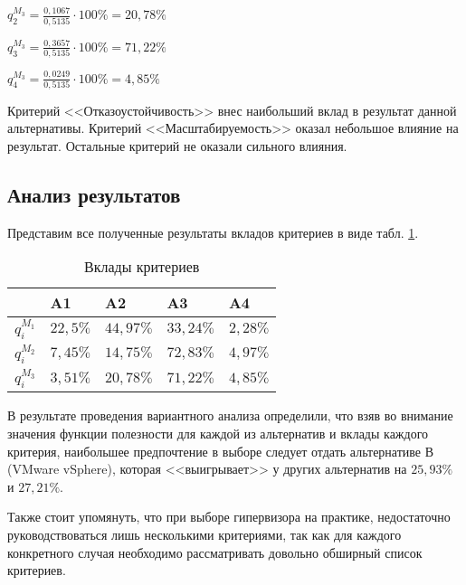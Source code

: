 $q_{2}^{M_3} = \frac{0,1067}{0,5135} \cdot 100\% = 20,78\%$

$q_{3}^{M_3} = \frac{0,3657}{0,5135} \cdot 100\% = 71,22\%$

$q_{4}^{M_3} = \frac{0,0249}{0,5135} \cdot 100\% = 4,85\%$

Критерий <<Отказоустойчивость>> внес наибольший вклад в результат данной альтернативы.
Критерий <<Масштабируемость>> оказал небольшое влияние на результат.
Остальные критерий не оказали сильного влияния.

\subsection{Анализ результатов}

Представим все полученные результаты вкладов критериев в виде табл. \ref{critdata}.
\begin{table}[H]
  \caption{Вклады критериев}\label{critdata}
  \begin{tabular}{|l|l|l|l|l|}
  \hline  & A1 & A2 & A3 & A4 \\
  \hline $q_{i}^{M_1}$ & $22,5\%$ & $44,97\%$ & $33,24\%$ & $2,28\%$ \\
  \hline $q_{i}^{M_2}$ & $7,45\%$ & $14,75\%$ & $72,83\%$ & $4,97\%$ \\
  \hline $q_{i}^{M_3}$ & $3,51\%$ & $20,78\%$ & $71,22\%$ & $4,85\%$ \\
  \hline
  \end{tabular}
\end{table}

В результате проведения вариантного анализа определили, что взяв во внимание значения функции полезности для каждой из альтернатив и вклады каждого критерия, наибольшее предпочтение в выборе следует отдать альтернативе В (VMware vSphere), которая <<выигрывает>> у других альтернатив на $25,93\%$ и $27,21\%$.

Также стоит упомянуть, что при выборе гипервизора на практике, недостаточно руководствоваться лишь несколькими критериями, так как для каждого конкретного случая необходимо рассматривать довольно обширный список критериев.

\clearpage
